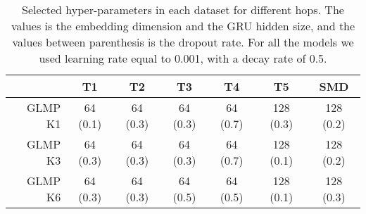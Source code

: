 \documentclass{article} \usepackage{iclr2019_conference,times}
\begin{document}
\begin{table}[h]
\centering
\setlength{\belowcaptionskip}{5pt} 
\caption{Selected hyper-parameters in each dataset for different hops. The values is the embedding dimension and the GRU hidden size, and the values between parenthesis is the dropout rate. For all the models we used learning rate equal to 0.001, with a decay rate of 0.5. }
\begin{tabular}{|r|c|c|c|c|c|c|}
\hline
\multicolumn{1}{|l|}{} & T1 & T2 & T3 & T4 & T5 & SMD \\ \hline
GLMP K1 & 64 (0.1) & 64 (0.3) & 64 (0.3) & 64 (0.7) & 128 (0.3) & 128 (0.2) \\ \hline
GLMP K3 & 64 (0.3) & 64 (0.3) & 64 (0.3) & 64 (0.7) & 128 (0.1) & 128 (0.2) \\ \hline
GLMP K6 & 64 (0.3) & 64 (0.3) & 64 (0.5) & 64 (0.5) & 128 (0.1) & 128 (0.3) \\ \hline
\end{tabular}
\end{table}
\end{document}
